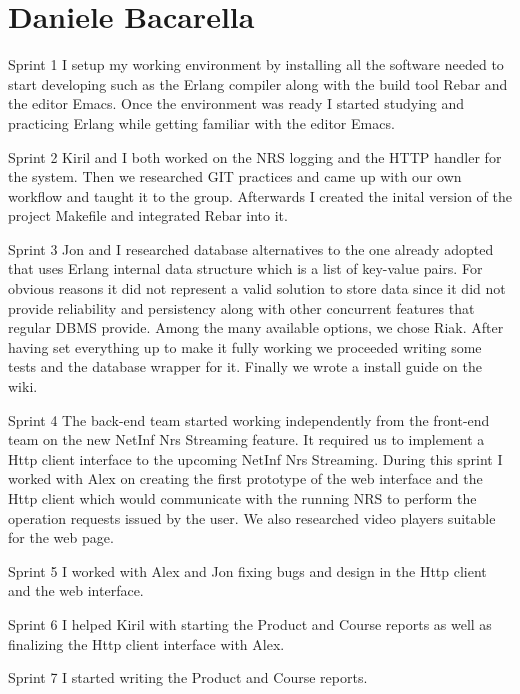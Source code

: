 \section{Daniele Bacarella}

Sprint 1
I setup my working environment by installing all the software needed to start developing such as the Erlang compiler along with the build tool Rebar and the editor Emacs.
Once the environment was ready I started studying and practicing Erlang while getting familiar with the editor Emacs.

Sprint 2
Kiril and I both worked on the NRS logging and the HTTP handler for the system. Then we researched GIT practices and came up with our own workflow and taught it to the group.
Afterwards I created the inital version of the project Makefile and integrated Rebar into it.

Sprint 3
Jon and I  researched database alternatives to the one already adopted that uses Erlang internal data structure which is  a list of key-value pairs. For obvious reasons it did not represent a valid solution to store data since it did not provide reliability and persistency along with other concurrent features that regular DBMS  provide.
Among the many available options, we chose Riak.
After having set everything up to make it fully working we proceeded writing some tests and the database wrapper for it.
Finally we wrote a install guide on the wiki. 

Sprint 4
The back-end team started working independently from the front-end team on the new NetInf Nrs Streaming feature.
It required us to implement a Http client interface to the upcoming NetInf Nrs Streaming.
During this sprint I worked with Alex on creating the first prototype of the web interface and the Http client which would communicate with the running NRS to perform the operation requests issued by the user.
We also researched video players suitable for the web page.

Sprint 5
I worked with Alex and Jon fixing bugs and design in the Http client and the web interface.

Sprint 6
I helped Kiril with starting the Product and Course reports as well as finalizing the Http client interface with Alex.

Sprint 7
I started writing the Product and Course reports.